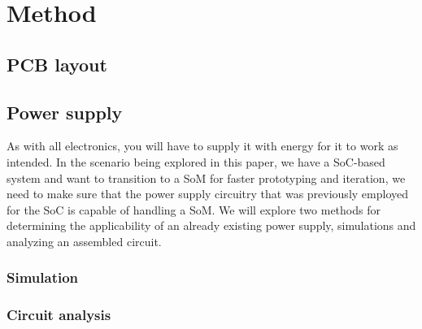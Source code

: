 \section{Method}

\subsection{PCB layout}


\subsection{Power supply}

As with all electronics, you will have to supply it with energy for it to work as intended. In the scenario being explored in this paper, we have a SoC-based system and want to transition to a SoM for faster prototyping and iteration, we need to make sure that the power supply circuitry that was previously employed for the SoC is capable of handling a SoM. We will explore two methods for determining the applicability of an already existing power supply, simulations and analyzing an assembled circuit.

\subsubsection{Simulation}

\subsubsection{Circuit analysis}